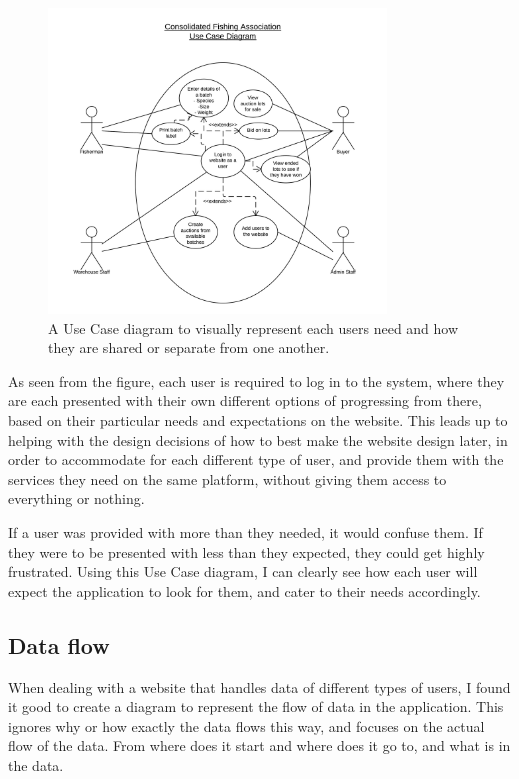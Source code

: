 \documentclass{article}
\begin{document}
\begin{figure}[H]
	\centering
	\includegraphics[width=0.8\textwidth]{img/TA-UCD1.png}
	\caption{A Use Case diagram to visually represent each users need and how they are shared or separate from one another.}
\end{figure}

As seen from the figure, each user is required to log in to the system, where they are each presented with their own different options of progressing from there, based on their particular needs and expectations on the website. This leads up to helping with the design decisions of how to best make the website design later, in order to accommodate for each different type of user, and provide them with the services they need on the same platform, without giving them access to everything or nothing.

If a user was provided with more than they needed, it would confuse them. If they were to be presented with less than they expected, they could get highly frustrated. Using this Use Case diagram, I can clearly see how each user will expect the application to look for them, and cater to their needs accordingly.

\subsection{Data flow}
When dealing with a website that handles data of different types of users, I found it good to create a diagram to represent the flow of data in the application. This ignores why or how exactly the data flows this way, and focuses on the actual flow of the data. From where does it start and where does it go to, and what is in the data. 
\end{document}
